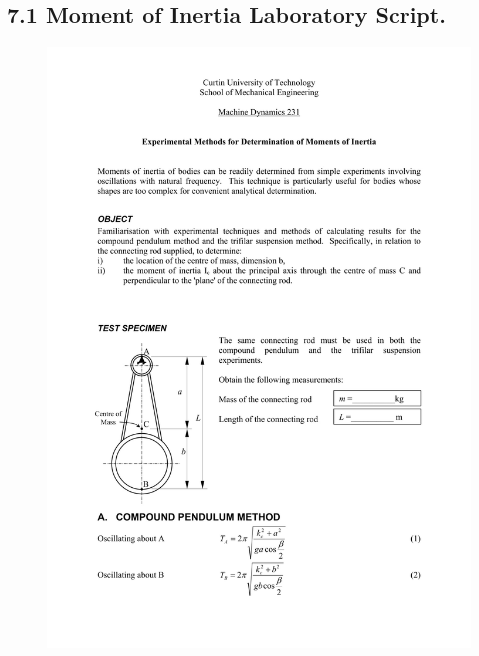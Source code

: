 \documentclass[12pt,a4paper]{report}
\begin{document}
\subsection*{7.1 Moment of Inertia Laboratory Script.}
\begin{figure}[H]
  \includegraphics[width=\linewidth]{lab1/lab1-1}
  \caption*{}
\label{}
\end{figure}
\end{document}
